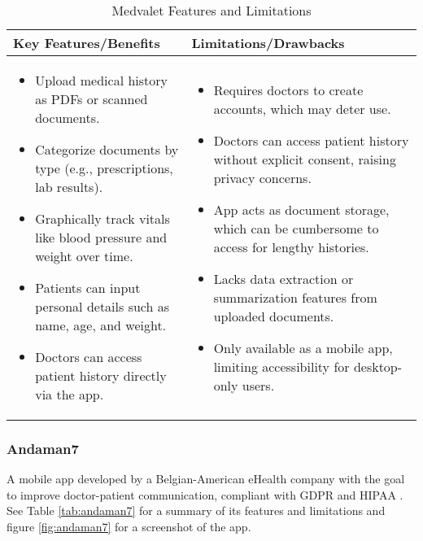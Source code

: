\begin{table}[h!]
\centering
    \begin{tabular}{|p{}|p{}|}
    \hline
    \textbf{Key Features/Benefits} & \textbf{Limitations/Drawbacks} \\ \hline
    \begin{itemize}
        \item Upload medical history as PDFs or scanned documents.
        \item Categorize documents by type (e.g., prescriptions, lab results).
        \item Graphically track vitals like blood pressure and weight over time.
        \item Patients can input personal details such as name, age, and weight.
        \item Doctors can access patient history directly via the app.
    \end{itemize} &
    \begin{itemize}
        \item Requires doctors to create accounts, which may deter use.
        \item Doctors can access patient history without explicit consent, raising privacy concerns.
        \item App acts as document storage, which can be cumbersome to access for lengthy histories.
        \item Lacks data extraction or summarization features from uploaded documents.
        \item Only available as a mobile app, limiting accessibility for desktop-only users.
    \end{itemize} \\ \hline
    \end{tabular}
\caption{Medvalet Features and Limitations}
\label{tab:medvalet}
\end{table}

\FloatBarrier

\subsubsection{Andaman7}

A mobile app developed by a Belgian-American eHealth company with the goal to improve doctor-patient communication, compliant with GDPR and HIPAA \parencite{andaman}. See Table \ref{tab:andaman7} for a summary of its features and limitations and figure \ref{fig:andaman7} for a screenshot of the app.

